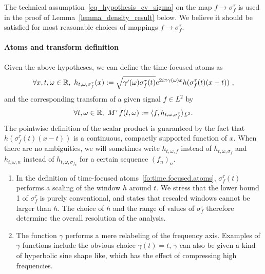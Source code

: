 \begin{remark}
    The technical assumption~\eqref{eq_hypothesis_cv_sigma} on the map $f\to\sigma_f^\tau$ is used in the proof of Lemma~\ref{lemma_density_result} below. We believe it should be satisfied for most reasonable choices of mappings $f\to\sigma_f^\tau$.
\end{remark}

\paragraph{Atoms and transform definition} Given the above hypotheses, we can define the  time-focused atoms as
\begin{equation}
\label{fo:time.focused.atoms}
	\forall x,t,\omega \in\R , \ h_{t,\omega,\sigma_f^\tau}(x):=  \sqrt{\gamma'(\omega)\sigma_f^\tau(t)} e^{2i\pi\gamma(\omega)x}h(\sigma_f^\tau(t)(x-t))\ ,
\end{equation}
and the corresponding transform of a given signal $f\in L^2$ by
\begin{equation}\label{eq_def_operator_time_focus}
	\forall t,\omega\in\mathbb{R}, \ M^\tau f(t,\omega) := \langle f , h_{t,\omega,\sigma_f^\tau} \rangle_{L^2}.
\end{equation}
The pointwise definition of the scalar product is guaranteed by the fact that $h(\sigma_f^\tau(t)(x-t))$ is a continuous, compactly supported function of $x$.
When there are no ambiguities, we will sometimes write $h_{t,\omega,f}$ instead of $h_{t,\omega,\sigma_f}$ and $h_{t,\omega,n}$ instead of $h_{t,\omega,\sigma_{f_n}}$ for a certain sequence $(f_n)_n$.
\begin{remark}
\begin{enumerate}
    \item
    In the definition of time-focused atoms~\eqref{fo:time.focused.atoms}, $\sigma_f^\tau(t)$ performs a scaling of the window $h$ around $t$. We stress that the lower bound 1 of $\sigma_f^\tau$ is purely conventional, and states that rescaled windows cannot be larger than $h$. The choice of $h$ and the range of values of $\sigma_f^\tau$ therefore determine the overall resolution of the analysis.
    \item The function $\gamma$ performs a mere relabeling of the frequency axis.
    Examples of $\gamma$ functions include the obvious choice $\gamma(t)=t$, $\gamma$ can also be given a kind of hyperbolic sine shape like, which has the effect of compressing high frequencies.
\end{enumerate}
\end{remark}


